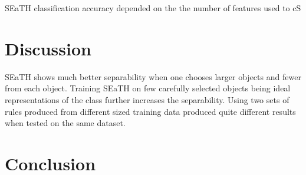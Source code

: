 \documentclass[a4paper,12pt]{article}
\begin{document}
SEaTH classification accuracy depended on the the number of features used to cS


\section{Discussion}
SEaTH shows much better separability when one chooses larger objects and fewer
from each object. Training SEaTH on few carefully selected objects being ideal
representations of the class further increases the separability. Using two sets
of rules produced from different sized training data produced quite different
results when tested on the same dataset. 
\section{Conclusion}
\end{document}
